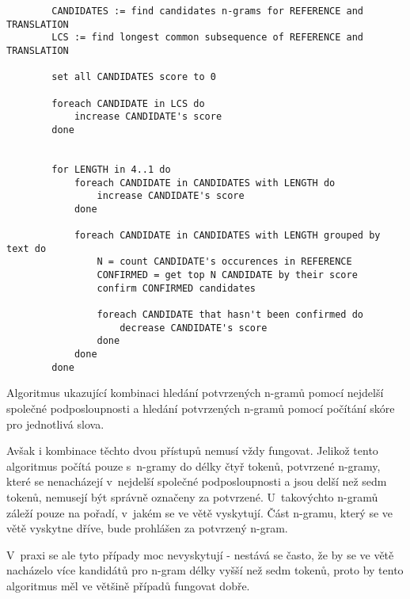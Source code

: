 \begin{algorithm}
	\begin{verbatim}
		CANDIDATES := find candidates n-grams for REFERENCE and TRANSLATION
		LCS := find longest common subsequence of REFERENCE and TRANSLATION

		set all CANDIDATES score to 0

		foreach CANDIDATE in LCS do
		    increase CANDIDATE's score
		done


		for LENGTH in 4..1 do
		    foreach CANDIDATE in CANDIDATES with LENGTH do
		        increase CANDIDATE's score
		    done

		    foreach CANDIDATE in CANDIDATES with LENGTH grouped by text do
		        N = count CANDIDATE's occurences in REFERENCE
		        CONFIRMED = get top N CANDIDATE by their score
		        confirm CONFIRMED candidates
		        
		        foreach CANDIDATE that hasn't been confirmed do
		            decrease CANDIDATE's score
		        done
		    done
		done
	\end{verbatim}
	\caption{
		Algoritmus ukazující kombinaci hledání potvrzených n-gramů pomocí nejdelší společné podposloupnosti
		a hledání potvrzených n-gramů pomocí počítání skóre pro jednotlivá slova.
	}
	\label{alg:confirmed}
\end{algorithm}



Avšak i kombinace těchto dvou přístupů nemusí vždy fungovat.
Jelikož tento algoritmus počítá pouze s~\mbox{n-gramy} do délky čtyř tokenů,
  potvrzené \mbox{n-gramy},
  které se nenacházejí v~nejdelší společné podposloupnosti a jsou delší než sedm tokenů,
  nemusejí být správně označeny za potvrzené.
U~takovýchto \mbox{n-gramů} záleží pouze na pořadí, v~jakém se ve větě vyskytují.
Část \mbox{n-gramu},
  který se ve větě vyskytne dříve,
  bude prohlášen za potvrzený \mbox{n-gram}.

V~praxi se ale tyto případy moc nevyskytují -
  nestává se často, že by se ve větě nacházelo více kandidátů pro \mbox{n-gram} délky vyšší než sedm tokenů,
  proto by tento algoritmus měl ve většině případů fungovat dobře.


